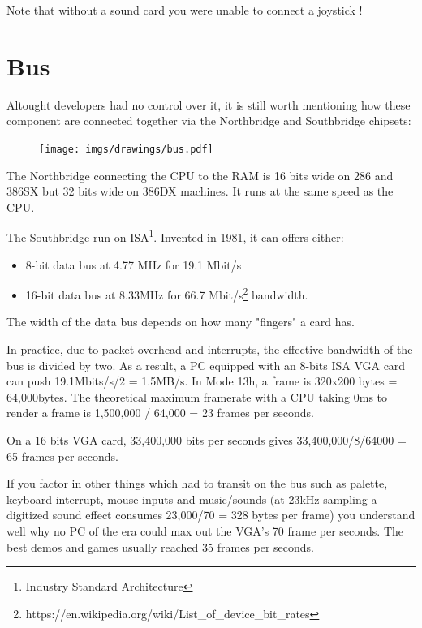 \documentclass[book.tex]{subfiles}
\begin{document}
Note that without a sound card you were unable to connect a joystick !


\section{Bus}
Altought developers had no control over it, it is still worth mentioning how these component are connected together via the Northbridge and Southbridge chipsets:\\ 
\par
\begin{figure}[H]
\centering
      \texttt{[image: imgs/drawings/bus.pdf]}
\end{figure}
\par
The Northbridge connecting the CPU to the RAM is 16 bits wide on 286 and 386SX but 32 bits wide on 386DX machines. It runs at the same speed as the CPU.\\
\par
The Southbridge run on ISA\footnote{Industry Standard Architecture}. Invented in 1981, it can offers either:
\begin{itemize}
\item 8-bit data bus at 4.77 MHz  for 19.1 Mbit/s
\item 16-bit data bus at 8.33MHz for 66.7 Mbit/s\footnote{https://en.wikipedia.org/wiki/List\_of\_device\_bit\_rates} bandwidth.
\end{itemize}
The width of the data bus depends on how many "fingers" a card has.\\
\par

 In practice, due to packet overhead and interrupts, the effective bandwidth of the bus is divided by two. As a result, a PC equipped with an 8-bits ISA VGA card can push 19.1Mbits/s/2 = 1.5MB/s. In Mode 13h, a frame is 320x200 bytes = 64,000bytes. The theoretical maximum framerate with a CPU taking 0ms to render a frame is 1,500,000 / 64,000 = 23 frames per seconds.\\
 \par
 On a 16 bits VGA card, 33,400,000 bits per seconds gives 33,400,000/8/64000 = 65 frames per seconds.\\
 \par
 If you factor in other things which had to transit on the bus such as palette, keyboard interrupt, mouse inputs and music/sounds (at 23kHz sampling a digitized sound effect consumes 23,000/70 = 328 bytes per frame) you understand well why no PC of the era could max out the VGA's 70 frame per seconds. The best demos and games usually reached 35 frames per seconds.
\end{document}
